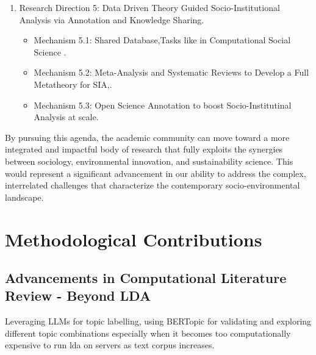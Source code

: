 \documentclass[12pt]{article}
\begin{document}
\begin{enumerate}
\begin{itemize}
    \item Mechanism 4.2: Use qualitative methods for topics dominated by quantitative research and vice versa.
    \end{itemize}
    \item Research Direction 5: Data Driven Theory Guided Socio-Institutional Analysis via Annotation and Knowledge Sharing.
\begin{itemize}
    \item Mechanism 5.1: Shared Database,Tasks like in Computational Social Science .
    \item Mechanism 5.2: Meta-Analysis and Systematic Reviews to Develop a Full Metatheory for SIA,\cite{edwards 2014,de haan et al 2021}.
    \item Mechanism 5.3: Open Science Annotation to boost Socio-Institutinal Analysis at scale.
\end{itemize}
\end{enumerate}
By pursuing this agenda, the academic community can move toward a more integrated and impactful body of research that fully exploits the synergies between sociology, environmental innovation, and sustainability science. This would represent a significant advancement in our ability to address the complex, interrelated challenges that characterize the contemporary socio-environmental landscape.

\section{Methodological Contributions}
\subsection{Advancements in Computational Literature Review - Beyond LDA}
Leveraging LLMs for topic labelling, using BERTopic for validating and exploring different topic combinations especially when it becomes too computationally expensive to run lda on servers as text corpus increases.
\end{document}

